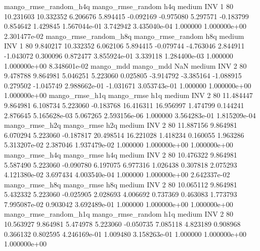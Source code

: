 mango_rmse_random_h4q mango_rmse_random                  h4q     medium      INV                 1 80 10.231603      10.332352 6.206676       5.894415   -0.092169     -0.975080      5.297571    -0.183799       0.854642  1.429845 1.567044e-01     3.742942   3.435040e-04            1.000000    1.000000e+00        2.301477e-02
mango_rmse_random_h8q mango_rmse_random                  h8q     medium      INV                 1 80  9.840217      10.332352 6.062106       5.894415   -0.079744     -4.763046      2.844911    -1.043072       0.300096  0.872477 3.855924e-01     3.339118   1.284400e-03            1.000000    1.000000e+00        8.348601e-02
            mango_mdd         mango_mdd                  NaN     medium      INV                 2 80  9.478788       9.864981 5.046251       5.223060    0.025805     -3.914792     -3.385164    -1.088915       0.279502 -1.045749 2.988662e-01    -1.031671   3.053743e-01            1.000000    1.000000e+00        1.000000e+00
       mango_rmse_h1q        mango_rmse                  h1q     medium      INV                 2 80 11.484447       9.864981 6.108734       5.223060   -0.183768     16.416311     16.956997     1.474799       0.144241  2.876645 5.165628e-03     5.067265   2.593156e-06            1.000000    3.564283e-01        1.815209e-04
       mango_rmse_h2q        mango_rmse                  h2q     medium      INV                 2 80 11.887156       9.864981 6.070294       5.223060   -0.187817     20.498514     16.221028     1.418234       0.160055  1.963286 5.313207e-02     2.387046   1.937479e-02            1.000000    1.000000e+00        1.000000e+00
       mango_rmse_h4q        mango_rmse                  h4q     medium      INV                 2 80 10.476322       9.864981 5.587490       5.223060   -0.090780      6.197075      6.977316     1.026438       0.307818  2.075293 4.121380e-02     3.697434   4.003540e-04            1.000000    1.000000e+00        2.642337e-02
       mango_rmse_h8q        mango_rmse                  h8q     medium      INV                 2 80 10.065112       9.864981 5.432332       5.223060   -0.025905      2.028693      4.006692     0.737369       0.463083  1.773793 7.995087e-02     0.903042   3.692489e-01            1.000000    1.000000e+00        1.000000e+00
mango_rmse_random_h1q mango_rmse_random                  h1q     medium      INV                 2 80 10.563927       9.864981 5.474978       5.223060   -0.050735      7.085118      4.823189     0.908968       0.366132  0.802595 4.246169e-01     1.009480   3.158263e-01            1.000000    1.000000e+00        1.000000e+00
